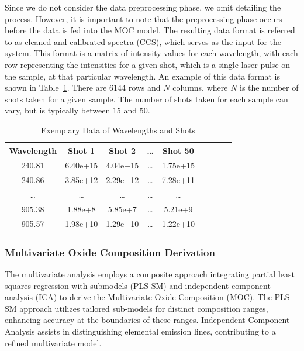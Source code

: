 Since we do not consider the data preprocessing phase, we omit detailing the process. However, it is important to note that the preprocessing phase occurs before the data is fed into the MOC model.
The resulting data format is referred to as cleaned and calibrated spectra (CCS), which serves as the input for the system.
This format is a matrix of intensity values for each wavelength, with each row representing the intensities for a given shot, which is a single laser pulse on the sample, at that particular wavelength. An example of this data format is shown in Table~\ref{tab:example_data}. There are $6144$ rows and $N$ columns, where $N$ is the number of shots taken for a given sample. The number of shots taken for each sample can vary, but is typically between $15$ and $50$.

\begin{table}[ht]
\centering
\caption{Exemplary Data of Wavelengths and Shots}
\label{tab:example_data}
\begin{tabular}{|c|c|c|c|c|c|c|c|c|}
\hline
Wavelength & Shot 1   & Shot 2 & \ldots & Shot 50  \\ \hline
240.81     & 6.40e+15 & 4.04e+15 & \ldots& 1.75e+15 \\ \hline
240.86     & 3.85e+12 & 2.29e+12& \ldots & 7.28e+11 \\ \hline
\ldots     & \ldots & \ldots & \ldots & \ldots \\ \hline
905.38     & 1.88e+8 & 5.85e+7 & \ldots & 5.21e+9 \\ \hline
905.57     & 1.98e+10 & 1.29e+10& \ldots & 1.22e+10 \\ \hline
\end{tabular}
\end{table}



\subsubsection{Multivariate Oxide Composition Derivation}\label{sec:moc_derivation}

The multivariate analysis employs a composite approach integrating partial least squares regression with submodels (PLS-SM) and independent component analysis (ICA) to derive the Multivariate Oxide Composition (MOC).
The PLS-SM approach utilizes tailored sub-models for distinct composition ranges, enhancing accuracy at the boundaries of these ranges.
Independent Component Analysis assists in distinguishing elemental emission lines, contributing to a refined multivariate model.

